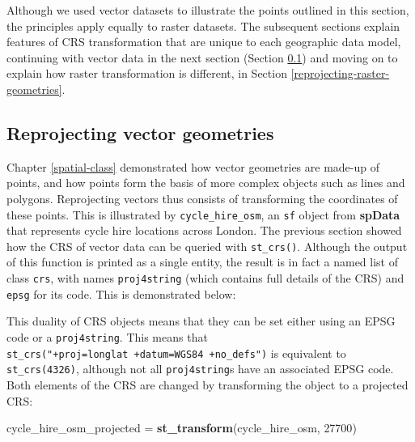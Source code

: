 \documentclass[]{krantz}
\newenvironment{Shaded}{\begin{snugshade}}{\end{snugshade}}
\newcommand{\CommentTok}[1]{\textcolor[rgb]{0.37,0.37,0.37}{\textit{#1}}}
\newcommand{\DecValTok}[1]{\textcolor[rgb]{0.06,0.06,0.06}{#1}}
\newcommand{\KeywordTok}[1]{\textcolor[rgb]{0.27,0.27,0.27}{\textbf{#1}}}
\newcommand{\NormalTok}[1]{#1}
\newcommand{\OperatorTok}[1]{\textcolor[rgb]{0.43,0.43,0.43}{\textbf{#1}}}
\newcommand{\StringTok}[1]{\textcolor[rgb]{0.5,0.5,0.5}{#1}}
\begin{document}
Although we used vector datasets to illustrate the points outlined in this section, the principles apply equally to raster datasets.
The subsequent sections explain features of CRS transformation that are unique to each geographic data model, continuing with vector data in the next section (Section \ref{reproj-vec-geom}) and moving on to explain how raster transformation is different, in Section \ref{reprojecting-raster-geometries}.

\hypertarget{reproj-vec-geom}{%
\subsection{Reprojecting vector geometries}\label{reproj-vec-geom}}

Chapter \ref{spatial-class} demonstrated how vector geometries are made-up of points, and how points form the basis of more complex objects such as lines and polygons.
Reprojecting vectors thus consists of transforming the coordinates of these points.
This is illustrated by \texttt{cycle\_hire\_osm}, an \texttt{sf} object from \textbf{spData} that represents cycle hire locations across London.
The previous section showed how the CRS of vector data can be queried with \texttt{st\_crs()}.
Although the output of this function is printed as a single entity, the result is in fact a named list of class \texttt{crs}, with names \texttt{proj4string} (which contains full details of the CRS) and \texttt{epsg} for its code.
This is demonstrated below:

\begin{Shaded}
\end{Shaded}

This duality of CRS objects means that they can be set either using an EPSG code or a \texttt{proj4string}.
This means that \texttt{st\_crs("+proj=longlat\ +datum=WGS84\ +no\_defs")} is equivalent to \texttt{st\_crs(4326)}, although not all \texttt{proj4string}s have an associated EPSG code.
Both elements of the CRS are changed by transforming the object to a projected CRS:

\begin{Shaded}
\begin{Highlighting}[]
\NormalTok{cycle_hire_osm_projected =}\StringTok{ }\KeywordTok{st_transform}\NormalTok{(cycle_hire_osm, }\DecValTok{27700}\NormalTok{)}
\end{Highlighting}
\end{Shaded}
\end{document}

